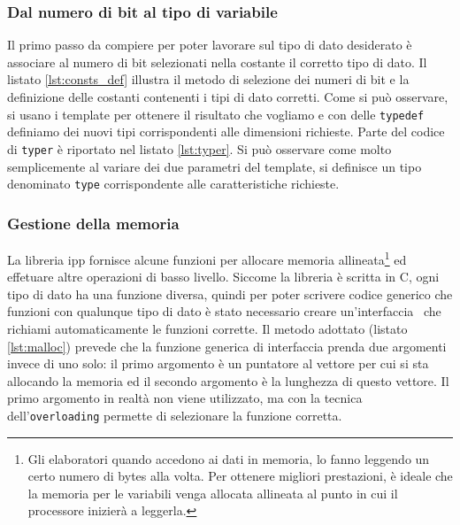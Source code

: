 \subsubsection{Dal numero di bit al tipo di variabile}
Il primo passo da compiere per poter lavorare sul tipo di dato desiderato \`e
associare al numero di bit selezionati nella costante il corretto tipo di dato.
Il listato \ref{lst:consts_def} illustra il metodo di selezione dei numeri di bit e
la definizione delle costanti contenenti i tipi di dato corretti. Come si pu\`o
osservare, si usano i template per ottenere il risultato che vogliamo e con
delle \texttt{typedef} definiamo dei nuovi tipi corrispondenti alle dimensioni
richieste. Parte del codice di \texttt{typer} \`e riportato nel listato
\ref{lst:typer}. Si pu\`o osservare come molto semplicemente al variare dei due
parametri del template, si definisce un tipo denominato \texttt{type}
corrispondente alle caratteristiche richieste.





\subsubsection{Gestione della memoria}
La libreria \ac{ipp} fornisce alcune funzioni per allocare memoria
allineata\footnote{Gli elaboratori quando accedono ai dati in memoria, lo fanno
leggendo un certo numero di bytes alla volta. Per ottenere migliori
prestazioni, \`e ideale che la memoria per le variabili venga allocata
allineata al punto in cui il processore inizier\`a a leggerla.} ed effetuare
altre operazioni di basso livello. Siccome la libreria \`e scritta in C, ogni
tipo di dato ha una funzione diversa, quindi per poter scrivere codice generico
che funzioni con qualunque tipo di dato \`e stato necessario creare
un'interfaccia \CC\, che richiami automaticamente le funzioni corrette. Il metodo
adottato (listato \ref{lst:malloc}) prevede che la funzione generica di
interfaccia prenda due argomenti invece di uno solo: il primo argomento \`e un
puntatore al vettore per cui si sta allocando la memoria ed il secondo
argomento \`e la lunghezza di questo vettore. Il primo argomento in realt\`a
non viene utilizzato, ma con la tecnica dell'\texttt{overloading} permette di
selezionare la funzione corretta.

